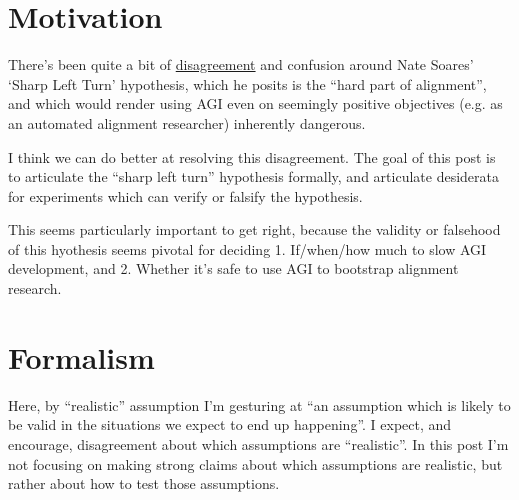 \documentclass{article}
\begin{document}
\section{Motivation}
There's been quite a bit of \href{https://www.alignmentforum.org/posts/iy2o4nQj9DnQD7Yhj/discussion-with-nate-soares-on-a-key-alignment-difficulty}{disagreement} and confusion around Nate Soares' `Sharp Left Turn' hypothesis, which he posits is the ``hard part of alignment'', and which would render using AGI even on seemingly positive objectives (e.g. as an automated alignment researcher) inherently dangerous.

I think we can do better at resolving this disagreement. 
The goal of this post is to articulate the “sharp left turn” hypothesis formally, and articulate desiderata for experiments which can verify or falsify the hypothesis. 

This seems particularly important to get right, because the validity or falsehood of this hyothesis seems pivotal for deciding 1. If/when/how much to slow AGI development, and 2. Whether it’s safe to use AGI to bootstrap alignment research.

\section{Formalism}


Here, by “realistic” assumption I’m gesturing at “an assumption which is likely to be valid in the situations we expect to end up happening”. I expect, and encourage, disagreement about which assumptions are “realistic”. In this post I’m not focusing on making strong claims about which assumptions are realistic, but rather about how to test those assumptions.
\end{document}
